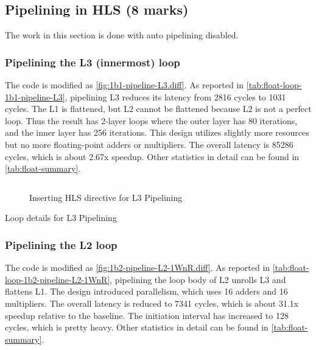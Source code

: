 \subsection{Pipelining in HLS (8 marks)}

The work in this section is done with auto pipelining disabled.

\subsubsection{Pipelining the L3 (innermost) loop}\label{sec:1bL3}

The code is modified as \autoref{fig:1b1-pipeline-L3.diff}.
As reported in \autoref{tab:float-loop-1b1-pipeline-L3}, pipelining L3 reduces its latency from 2816 cycles to 1031 cycles.
The L1 is flattened, but L2 cannot be flattened because L2 is not a perfect loop.
Thus the result has 2-layer loops where the outer layer has 80 iterations, and the inner layer has 256 iterations.
This design utilizes slightly more resources but no more floating-point adders or multipliers.
The overall latency is 85286 cycles, which is about 2.67x speedup.
Other statistics in detail can be found in \autoref{tab:float-summary}.

\begin{figure}[ht!]
    \centering
    \inputminted[firstline=3]{diff}{program/1b1-pipeline-L3.diff}
    \caption{Inserting HLS directive for L3 Pipelining}\label{fig:1b1-pipeline-L3.diff}
\end{figure}

\begin{table}[ht!]
    \caption{Loop details for L3 Pipelining}
    \label{tab:float-loop-1b1-pipeline-L3}
    \centering
    
\end{table}

\subsubsection{Pipelining the L2 loop}\label{sec:1bL2}

The code is modified as \autoref{fig:1b2-pipeline-L2-1WnR.diff}.
As reported in \autoref{tab:float-loop-1b2-pipeline-L2-1WnR}, pipelining the loop body of L2 unrolls L3 and flattens L1.
The design introduced parallelism, which uses 16 adders and 16 multipliers.
The overall latency is reduced to 7341 cycles, which is about 31.1x speedup relative to the baseline.
The initiation interval has increased to 128 cycles, which is pretty heavy.
Other statistics in detail can be found in \autoref{tab:float-summary}.

